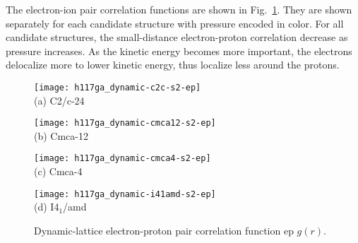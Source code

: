 

\begin{comment}
\begin{table}[h]
\centering
\begin{tabular}{cccccc}
\toprule
     & Temperature & Classical & Quantum & Quantization & Sign Problem \\
\midrule
PIMC &     any     &   yes     &   yes   & first & $\braket{\sigma}\propto \exp\left[ -\beta N (F_f-F_b) \right]$ \\
DMC  &    zero     &    no     &   yes   & first & $\braket{\sigma}\propto \exp\left[ -\beta N (F_f-F_T) \right]$ \\
FP-DMC & zero & no & yes & first & no \\
VMC & low & no & yes & first & no \\
AFQMC & low & no & yes & second & ? \\
\bottomrule
\end{tabular}
\end{table}
\end{comment}

The electron-ion pair correlation functions are shown in Fig.~\ref{fig:hsolid-epgr}.
They are shown separately for each candidate structure with pressure encoded in color.
For all candidate structures, the small-distance electron-proton correlation decrease as pressure increases.
As the kinetic energy becomes more important, the electrons delocalize more to lower kinetic energy, thus localize less around the protons.

\begin{figure}[h]
\centering
\begin{minipage}{0.49\textwidth}
\centering
\texttt{[image: h117ga\_dynamic-c2c-s2-ep]}\\
(a) C2/c-24
\end{minipage}
\begin{minipage}{0.49\textwidth}
\centering
\texttt{[image: h117ga\_dynamic-cmca12-s2-ep]}\\
(b) Cmca-12
\end{minipage}
\begin{minipage}{0.49\textwidth}
\centering
\texttt{[image: h117ga\_dynamic-cmca4-s2-ep]}\\
(c) Cmca-4
\end{minipage}
\begin{minipage}{0.49\textwidth}
\centering
\texttt{[image: h117ga\_dynamic-i41amd-s2-ep]}\\
(d) I4$_1$/amd
\end{minipage}
\caption{Dynamic-lattice electron-proton pair correlation function ep $g(r)$.}
\label{fig:hsolid-epgr}
\end{figure}